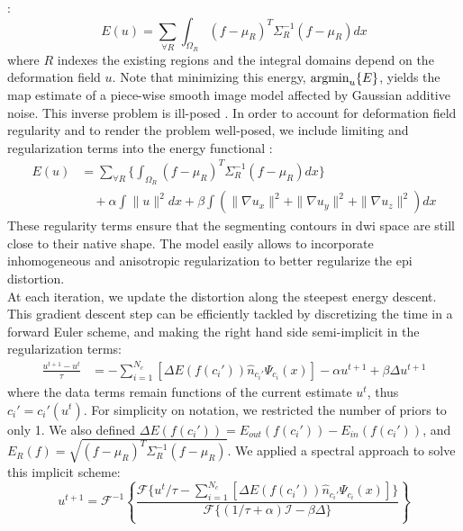 \cite{chan_active_2001}:
\begin{equation}
\label{eq:gaussian_energy}
E(u)= \sum_{\forall{R}} \int_{\Omega_R} (f-\mu_R)^T\Sigma_R^{-1}(f-\mu_R) dx
\end{equation}
where $R$ indexes the existing regions and the integral domains
depend on the deformation field $u$. Note
that minimizing this energy, $\operatorname{argmin}_u\{E\}$, yields the \ac{map} 
estimate of a piece-wise smooth image model affected by Gaussian 
additive noise. This inverse problem is ill-posed
\cite{bertero_ill-posed_1988,hadamard_sur_1902}.
In order to account for deformation field regularity and to render the 
problem well-posed, we include limiting and regularization terms into 
the energy functional \cite{morozov_linear_1975,tichonov_solution_1963}:
%
\begin{align}
\label{eq:complete_energy}
E(u) &= \sum_{\forall{R}} \lbrace \int_{\Omega_R} (f-\mu_R)^T\Sigma_R^{-1}(f-\mu_R) dx \rbrace \nonumber \\
&\quad + \alpha \int  \|u\|^2 dx + \beta \int \left( \|\nabla u_x\|^2 + \|\nabla u_y\|^2 + \|\nabla u_z\|^2\right) dx
\end{align}
%
These regularity terms ensure that the segmenting contours in 
\ac{dwi} space are still close to their native shape. The model
easily allows to incorporate inhomogeneous and anisotropic 
regularization \cite{nagel_investigation_1986} to better regularize
the \ac{epi} distortion. \\
%

At each iteration, we update the distortion along the steepest 
energy descent. This gradient descent step can be efficiently 
tackled by discretizing the time in a forward Euler scheme, 
and making the right hand side semi-implicit in the 
regularization terms:
%
\begin{align}
\frac{u^{t+1}-u^t}{\tau} &= - \sum_{i=1}^{N_c} \left[ \Delta E(f(c_i'))  \hat{n}_{c_i'} \Psi_{c_i}(x) \right] -\alpha u^{t+1} + \beta\Delta u^{t+1}
\end{align}
%
where the data terms remain functions of the current estimate 
$u^t$, thus $c_i' = c_i'(u^t)$. For simplicity on notation, we 
restricted the number of priors to only 1. We also defined 
$\Delta E(f(c_i')) = E_{out}(f(c_i')) - E_{in}(f(c_i'))$, 
and $E_R(f) = \sqrt{(f-\mu_R)^T\Sigma_R^{-1}(f-\mu_R)}$.
We applied a spectral approach to solve this implicit scheme:
%
\begin{equation}
u^{t+1} = \mathcal{F}^{-1}\left\{ \frac{\mathcal{F}\{u^t/\tau
- \sum_{i=1}^{N_c} \left[ \Delta E(f(c_i')) \hat{n}_{c_i'} \Psi_{c_i}(x) \right]  \}}{\mathcal{F}\{(1/\tau+\alpha)\mathcal{I}-\beta\Delta\}} \right\}
\end{equation}
%
